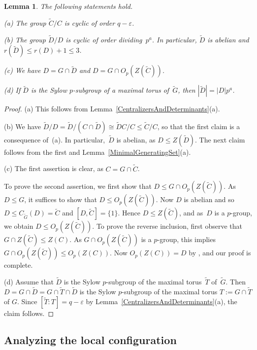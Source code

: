 \documentclass[12pt]{amsart}
\newtheorem{lem}[thm]{Lemma}
\theoremstyle{theorem}
\theoremstyle{definition}
\theoremstyle{remark}
\begin{document}
\begin{lem}
\label{TildeCmoduloC}
The following statements hold.

{\rm (a)} The group $\tilde{C}/C$ is cyclic of order $q - \varepsilon$.

{\rm (b)} The group $\tilde{D}/D$ is cyclic of order dividing~$p^a$. 
	In particular, $\tilde{D}$ is abelian and $r( \tilde{D} ) \leq 
	r(D) + 1 \leq 3$.

{\rm (c)} We have $D = G \cap \tilde{D}$ and $D = G \cap O_p( Z( \tilde{C} ) )$.

{\rm (d)} If $\tilde{D}$ is the Sylow $p$-subgroup of a maximal torus of~$\tilde{G}$,
then $|\tilde{D}| = |D|p^a$.

\end{lem}
\begin{proof}
(a) This follows from Lemma~\ref{CentralizersAndDeterminants}(a). 

(b) We have $\tilde{D}/D = \tilde{D}/(C \cap \tilde{D}) \cong \tilde{D}C/C 
\leq \tilde{C}/C$, so that the first claim is a consequence of~(a). In 
particular,~$\tilde{D}$ is abelian, as $D \leq Z( \tilde{D} )$. The next 
claim follows from the first and Lemma~\ref{MinimalGeneratingSet}(a).

(c) The first assertion is clear, as $C = G \cap \tilde{C}$. 

To prove the second assertion, we first show that 
$D \leq G \cap O_p( Z( \tilde{C} ) )$.
As $D \leq G$, it suffices to show that $D \leq O_p( Z( \tilde{C} ) )$.
Now $D$ is abelian and so $D \leq C_{\tilde{G}}( D ) = \tilde{C}$ and
$[D,\tilde{C}] = \{ 1 \}$. Hence $D \leq Z( \tilde{C} )$, and as~$D$
is a $p$-group, we obtain $D \leq O_p( Z( \tilde{C} ) )$.
To prove the reverse inclusion, first observe that 
$G \cap Z( \tilde{C} ) \leq Z( C )$.
As $G \cap O_p( Z( \tilde{C} ) )$ is a $p$-group, this implies 
$G \cap O_p( Z( \tilde{C} ) ) \leq O_p( Z( C ) )$. Now $O_p( Z( C ) ) = D$ by 
\cite[Lemma~$2.1$]{HL24}, and our proof is complete.

(d) Assume that $\tilde{D}$ is the Sylow $p$-subgroup of the maximal
torus~$\tilde{T}$ of~$\tilde{G}$. Then $D = G \cap \tilde{D} = 
G \cap \tilde{T} \cap \tilde{D}$ is the Sylow $p$-subgroup of the maximal
torus $T := G \cap \tilde{T}$ of $G$. Since $[\tilde{T}\colon\!T] = 
q - \varepsilon$ by Lemma~\ref{CentralizersAndDeterminants}(a), the claim 
follows. 
\end{proof}

\addtocounter{subsection}{2}
\subsection{Analyzing the local configuration}
\end{document}
